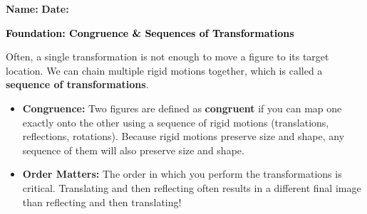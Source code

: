 \documentclass[12pt, letterpaper, fleqn]{article}
\begin{document}
\textbf{Name:} \underline{\hspace{5cm}}
\hfill
\textbf{Date:} \underline{\hspace{3cm}}\\

\begin{tcolorbox}[colback=customteal!20]
    \large\textcolor{black}{\textbf{Foundation: Congruence \& Sequences of Transformations}}
\end{tcolorbox}

\vspace{3mm}

\noindent
Often, a single transformation is not enough to move a figure to its target location. We can chain multiple rigid motions together, which is called a \textbf{sequence of transformations}.

\begin{itemize}
    \item \textbf{Congruence:} Two figures are defined as \textbf{congruent} if you can map one exactly onto the other using a sequence of rigid motions (translations, reflections, rotations). Because rigid motions preserve size and shape, any sequence of them will also preserve size and shape.
    \item \textbf{Order Matters:} The order in which you perform the transformations is critical. Translating and then reflecting often results in a different final image than reflecting and then translating!
\end{itemize}

\vspace{4mm}
\end{document}
